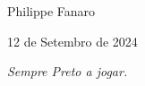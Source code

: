 \bigskip
\bigskip

Philippe Fanaro

12 de Setembro de 2024


\blankpage

\vspace*{\fill}

\begin{center}
  \Large \emph{Sempre Preto a jogar.}
\end{center}

\vspace*{\fill}

